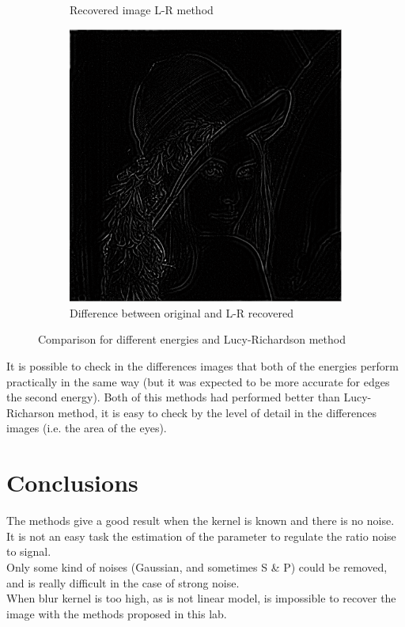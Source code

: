 \documentclass[a4paper, 10pt, conference] {article}
\begin{document}
\begin{figure}[H]
\begin{subfigure}{0.49\textwidth}
		\caption{Recovered image L-R method}
	\end{subfigure}
	\begin{subfigure}{0.49\textwidth} 
		\centering						
		\includegraphics[scale=0.45]{comparison/difference3.PNG}
		\caption{Difference between original and L-R recovered}
	\end{subfigure}
	
	\caption{Comparison for different energies and Lucy-Richardson method}
	\label{comparison1}
\end{figure}
It is possible to check in the differences images that both of the energies perform practically in the same way (but it was expected to be more accurate for edges the second energy). Both of this methods had performed better than Lucy-Richarson method, it is easy to check by the level of detail in the differences images (i.e. the area of the eyes).

\section{Conclusions}
The methods give a good result when the kernel is known and there is no noise. \\
It is not an easy task the estimation of the parameter to regulate the ratio noise to signal. \\
Only some kind of noises (Gaussian, and sometimes S \& P) could be removed, and is really difficult in the case of strong noise. \\
When blur kernel is too high, as is not linear model, is impossible to recover the image with the methods proposed in this lab. 
\end{document}
